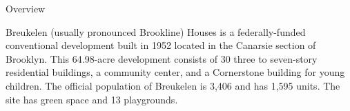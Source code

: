 Overview 

Breukelen (usually pronounced Brookline) Houses is a federally-funded conventional development built in 1952 located in the Canarsie section of Brooklyn. This 64.98-acre development consists of 30 three to seven-story residential buildings, a community center, and a Cornerstone building for young children. The official population of Breukelen is 3,406 and has 1,595 units. The site has green space and 13 playgrounds. 